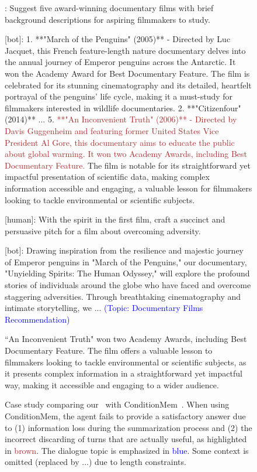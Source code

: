 \begin{figure}[htbp]
\small
\begin{tcolorbox}[left=3pt,right=3pt,top=3pt,bottom=3pt,title=\textbf{Retrieved Memory (Ours):}]
[human]: Suggest five award-winning documentary films with brief background descriptions for aspiring filmmakers to study.

[bot]: 1. **"March of the Penguins" (2005)** - Directed by Luc Jacquet, this French feature-length nature documentary delves into the annual journey of Emperor penguins across the Antarctic. It won the Academy Award for Best Documentary Feature. The film is celebrated for its stunning cinematography and its detailed, heartfelt portrayal of the penguins' life cycle, making it a must-study for filmmakers interested in wildlife documentaries. 2. **"Citizenfour" (2014)** ... 5. \textcolor{brown}{**"An Inconvenient Truth" (2006)** - Directed by Davis Guggenheim and featuring former United States Vice President Al Gore, this documentary aims to educate the public about global warming. It won two Academy Awards, including Best Documentary Feature.} The film is notable for its straightforward yet impactful presentation of scientific data, making complex information accessible and engaging, a valuable lesson for filmmakers looking to tackle environmental or scientific subjects.

[human]: With the spirit in the first film, craft a succinct and persuasive pitch for a film about overcoming adversity.

[bot]: Drawing inspiration from the resilience and majestic journey of Emperor penguins in "March of the Penguins," our documentary, "Unyielding Spirits: The Human Odyssey," will explore the profound stories of individuals around the globe who have faced and overcome staggering adversities. Through breathtaking cinematography and intimate storytelling, we ...
\textcolor{blue}{(Topic: Documentary Films Recommendation)}
\end{tcolorbox}
\begin{tcolorbox}[left=3pt,right=3pt,top=3pt,bottom=3pt,title=\textbf{Answer (Ours):}]
``An Inconvenient Truth" won two Academy Awards, including Best Documentary Feature. The film offers a valuable lesson to filmmakers looking to tackle environmental or scientific subjects, as it presents complex information in a straightforward yet impactful way, making it accessible and engaging to a wider audience.
\end{tcolorbox}
\caption{Case study comparing our \sysname\ with ConditionMem~\citep{yuan2023evolving}. When using ConditionMem, the agent fails to provide a satisfactory answer due to (1) information loss during the summarization process and (2) the incorrect discarding of turns that are actually useful, as highlighted in \textcolor{brown}{brown}. The dialogue topic is emphasized in \textcolor{blue}{blue}. Some context is omitted (replaced by ...) due to length constraints.}
\label{fig: case_study_segment_vs_condmem}
\end{figure}

